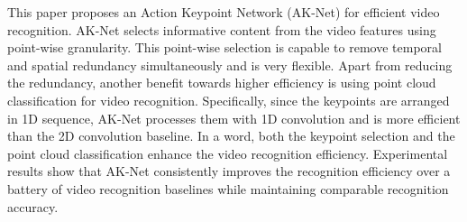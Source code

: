 \documentclass[journal]{IEEEtran}
\begin{document}
This paper proposes an Action Keypoint Network (AK-Net) for efficient video recognition. AK-Net  selects informative content from the video features using point-wise granularity. This point-wise selection is capable to remove temporal and spatial redundancy simultaneously and is very flexible. Apart from reducing the redundancy, another benefit towards higher efficiency is using point cloud classification for video recognition. Specifically, since the keypoints are arranged in 1D sequence, AK-Net processes them with 1D convolution and is more efficient than the 2D convolution baseline. In a word, both the keypoint selection and the point cloud classification enhance the video recognition efficiency. Experimental results show that AK-Net consistently improves the recognition efficiency over a battery of video recognition baselines while maintaining comparable recognition accuracy. 



\end{document}
